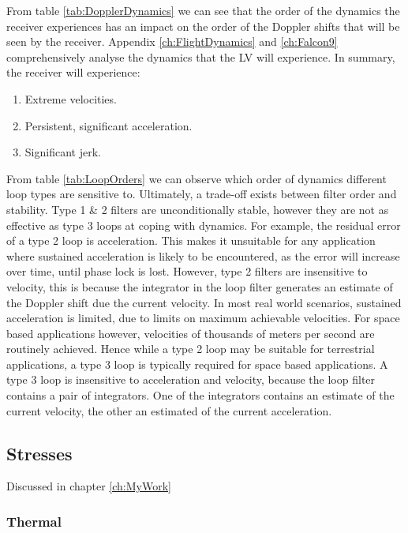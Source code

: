     From table \ref{tab:DopplerDynamics} we can see that the order of the dynamics the receiver
    experiences has an impact on the order of the Doppler shifts that will be seen by the receiver. Appendix \ref{ch:FlightDynamics} and \ref{ch:Falcon9} comprehensively analyse the dynamics that the \ac{LV} will experience. In summary, the receiver will experience:
    
    \begin{enumerate}
    \item{Extreme velocities.}
    \item{Persistent, significant acceleration.}
    \item{Significant jerk.}
    \end{enumerate}
    
    From table \ref{tab:LoopOrders} we can observe which order of dynamics different loop types are sensitive to. Ultimately, a trade-off exists between filter order and stability. Type 1 \& 2 filters are unconditionally stable, however they are not as effective as type 3 loops at coping with dynamics. For example, the residual error of a type 2 loop is acceleration. This makes it unsuitable for any application where sustained acceleration is likely to be encountered, as the error will increase over time, until phase lock is lost. However, type 2 filters are insensitive to velocity, this is because the integrator in the loop filter generates an estimate of the Doppler shift due the current velocity. In most real world scenarios, sustained acceleration is limited, due to limits on maximum achievable velocities. For space based applications however, velocities of thousands of meters per second are routinely achieved. Hence while a type 2 loop may be suitable for terrestrial applications, a type 3 loop is typically required for space based applications. A type 3 loop is insensitive to acceleration and velocity, because the loop filter contains a pair of integrators. One of the integrators contains an estimate of the current velocity, the other an estimated of the current acceleration\cite{Kaplan}. 
    
    
    
	\subsection{Stresses}
	    
	    Discussed in chapter \ref{ch:MyWork}
	    
		\subsubsection{Thermal}
